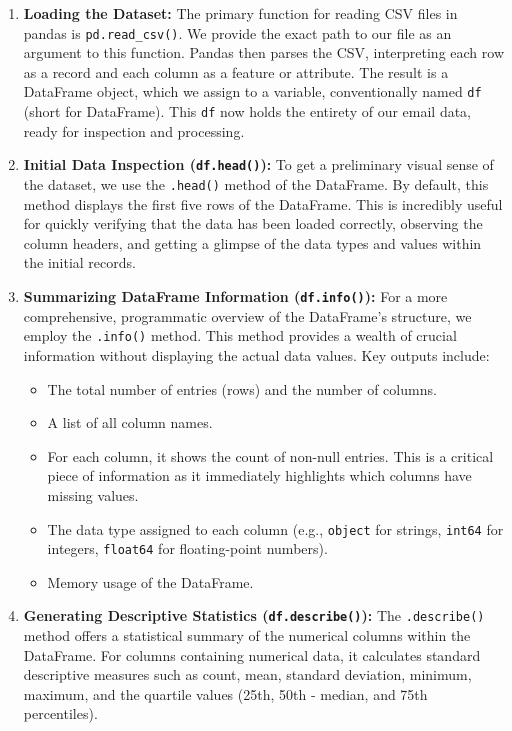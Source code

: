 \documentclass[12pt,letterpaper]{article}
\begin{document}
\begin{enumerate}
    \item \textbf{Loading the Dataset:} The primary function for reading CSV files in pandas is \texttt{pd.read\_csv()}. We provide the exact path to our file as an argument to this function. Pandas then parses the CSV, interpreting each row as a record and each column as a feature or attribute. The result is a DataFrame object, which we assign to a variable, conventionally named \texttt{df} (short for DataFrame). This \texttt{df} now holds the entirety of our email data, ready for inspection and processing.
    
    \item \textbf{Initial Data Inspection (\texttt{df.head()}):} To get a preliminary visual sense of the dataset, we use the \texttt{.head()} method of the DataFrame. By default, this method displays the first five rows of the DataFrame. This is incredibly useful for quickly verifying that the data has been loaded correctly, observing the column headers, and getting a glimpse of the data types and values within the initial records.
    
    \item \textbf{Summarizing DataFrame Information (\texttt{df.info()}):} For a more comprehensive, programmatic overview of the DataFrame's structure, we employ the \texttt{.info()} method. This method provides a wealth of crucial information without displaying the actual data values. Key outputs include:
    \begin{itemize}
        \item The total number of entries (rows) and the number of columns.
        \item A list of all column names.
        \item For each column, it shows the count of non-null entries. This is a critical piece of information as it immediately highlights which columns have missing values.
        \item The data type assigned to each column (e.g., \texttt{object} for strings, \texttt{int64} for integers, \texttt{float64} for floating-point numbers).
        \item Memory usage of the DataFrame.
    \end{itemize}
    
    \item \textbf{Generating Descriptive Statistics (\texttt{df.describe()}):} The \texttt{.describe()} method offers a statistical summary of the numerical columns within the DataFrame. For columns containing numerical data, it calculates standard descriptive measures such as count, mean, standard deviation, minimum, maximum, and the quartile values (25th, 50th - median, and 75th percentiles).
\end{enumerate}
\end{document}
